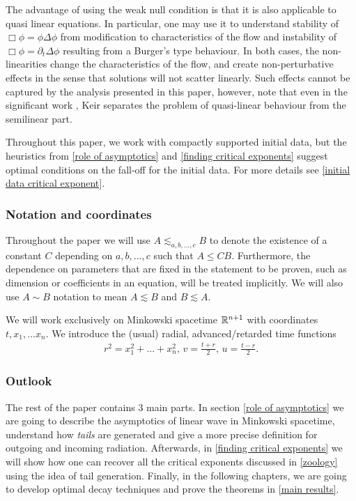 \documentclass[11pt, oneside]{amsart}
\begin{document}
	\begin{remark}
		The advantage of using the weak null condition is that it is also applicable to quasi linear equations. In particular, one may use it to understand stability of $\Box\phi=\phi\Delta\phi$ from modification to characteristics of the flow and instability of $\Box \phi=\partial_t\Delta\phi$ resulting from a Burger's type behaviour. In both cases, the non-linearities change the characteristics of the flow, and create non-perturbative effects in the sense that solutions will not scatter linearly. Such effects cannot be captured by the analysis presented in this paper, however, note that even in the significant work \cite{keir_weak_2018}, Keir separates the problem of quasi-linear behaviour from the semilinear part. 
	\end{remark}

	\begin{remark}
		Throughout this paper, we work with compactly supported initial data, but the heuristics from \cref{role of asymptotics} and \cref{finding critical exponents} suggest optimal conditions on the fall-off for the initial data. For more details see \cref{initial data critical exponent}.
	\end{remark}
	\subsubsection*{Notation and coordinates}\label{notation}
	Throughout the paper we will use $A\lesssim_{a,b,...,c} B$ to denote the existence of a constant $C$ depending on $a,b,...,c$ such that $A\leq CB$. Furthermore, the dependence on parameters that are fixed in the statement to be proven, such as dimension or coefficients in an equation, will be treated implicitly. We will also use $A\sim B$ notation to mean $A\lesssim B$ and $B\lesssim A$.
	
	We will work exclusively on Minkowski spacetime $\mathbb{R}^{n+1}$ with coordinates $t,x_1,...x_n$. We introduce the (usual) radial, advanced/retarded time functions 
	\begin{equation*}
		\begin{gathered}
			r^2=x_1^2+...+x_n^2,\,v=\frac{t+r}{2},\, u=\frac{t-r}{2}.
		\end{gathered}
	\end{equation*}
	\subsubsection*{Outlook}
	The rest of the paper contains 3 main parts. In section \cref{role of asymptotics} we are going to describe the asymptotics of linear wave in Minkowski spacetime, understand how \textit{tails} are generated and give a more precise definition for outgoing and incoming radiation. Afterwards, in \cref{finding critical exponents} we will show how one can recover all the critical exponents discussed in \cref{zoology} using the idea of tail generation. Finally, in the following chapters, we are going to develop optimal decay techniques and prove the theorems in \cref{main results}.
	
\end{document}

